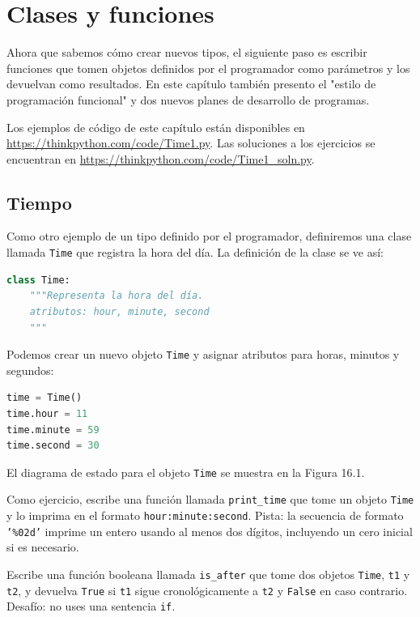 
\chapter{Clases y funciones}

Ahora que sabemos cómo crear nuevos tipos, el siguiente paso es escribir funciones que tomen objetos definidos por el programador como parámetros y los devuelvan como resultados. En este capítulo también presento el "estilo de programación funcional" y dos nuevos planes de desarrollo de programas.

Los ejemplos de código de este capítulo están disponibles en \url{https://thinkpython.com/code/Time1.py}. Las soluciones a los ejercicios se encuentran en \url{https://thinkpython.com/code/Time1_soln.py}.

\section{Tiempo}

Como otro ejemplo de un tipo definido por el programador, definiremos una clase llamada \texttt{Time} que registra la hora del día. La definición de la clase se ve así:

\begin{lstlisting}[language=Python]
class Time:
    """Representa la hora del día.
    atributos: hour, minute, second
    """
\end{lstlisting}

Podemos crear un nuevo objeto \texttt{Time} y asignar atributos para horas, minutos y segundos:

\begin{lstlisting}[language=Python]
time = Time()
time.hour = 11
time.minute = 59
time.second = 30
\end{lstlisting}

El diagrama de estado para el objeto \texttt{Time} se muestra en la Figura 16.1.

Como ejercicio, escribe una función llamada \texttt{print\_time} que tome un objeto \texttt{Time} y lo imprima en el formato \texttt{hour:minute:second}. Pista: la secuencia de formato \texttt{'\%02d'} imprime un entero usando al menos dos dígitos, incluyendo un cero inicial si es necesario.

Escribe una función booleana llamada \texttt{is\_after} que tome dos objetos \texttt{Time}, \texttt{t1} y \texttt{t2}, y devuelva \texttt{True} si \texttt{t1} sigue cronológicamente a \texttt{t2} y \texttt{False} en caso contrario. Desafío: no uses una sentencia \texttt{if}.


